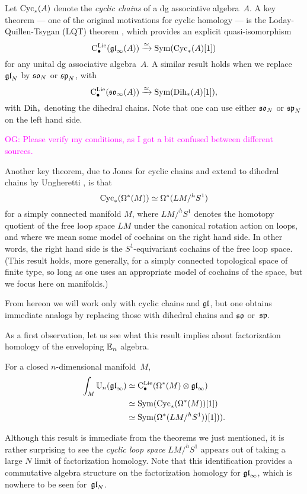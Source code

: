 \documentclass[11pt]{amsart}
\numberwithin{equation}{section}
\def\owen{\textcolor{magenta}{OG: }\textcolor{magenta}}
\begin{document}
Let ${\rm Cyc}_*(A)$ denote the {\em cyclic chains} of a dg associative algebra~$A$.
A key theorem --- one of the original motivations for cyclic homology --- is the Loday-Quillen-Tsygan (LQT) theorem \cite{},
which provides an explicit quasi-isomorphism
\begin{equation}
\label{eqn: LQT}
{\rm C}^{\rm Lie}_\bullet({\mathfrak{gl}}_\infty(A)) \xrightarrow{\simeq} {\rm Sym}({\rm Cyc}_*(A)[1])
\end{equation}
for any unital dg associative algebra~$A$.
A similar result \cite{} holds when we replace ${\mathfrak{gl}}_N$ by $\frak{so}_N$ or $\frak{sp}_N$, with
\[
\label{eqn: LQT}
{\rm C}^{\rm Lie}_\bullet({\frak{so}}_\infty(A)) \xrightarrow{\simeq} {\rm Sym}({\rm Dih}_*(A)[1]),
\]
with ${\rm Dih}_*$ denoting the dihedral chains.
Note that one can use either $\frak{so}_N$ or $\frak{sp}_N$ on the left hand side.

\owen{Please verify my conditions, as I got a bit confused between different sources.}

Another key theorem, due to Jones \cite{} for cyclic chains and extend to dihedral chains by Ungheretti \cite{},
is that
\[
{\rm Cyc}_*(\Omega^*(M)) \simeq \Omega^*(LM/^h S^1)
\]
for a simply connected manifold $M$, 
where $LM/^h S^1$ denotes the homotopy quotient of the free loop space $LM$ under the canonical rotation action on loops,
and where we mean some model of cochains on the right hand side.
In other words, the right hand side is the $S^1$-equivariant cochains of the free loop space.
(This result holds, more generally, for a simply connected topological space of finite type, so long as one uses an appropriate model of cochains of the space, 
but we focus here on manifolds.)

From hereon we will work only with cyclic chains and ${\mathfrak{gl}}$,
but one obtains immediate analogs by replacing those with dihedral chains and $\frak{so}$ or~$\frak{sp}$.

As a first observation, let us see what this result implies about factorization homology of the enveloping $\mathbb E_n$ algebra.

\begin{lmm}
For a closed $n$-dimensional manifold~$M$, 
\begin{align*}
\int_M \mathbb U_n(\frak{gl}_\infty)
&\simeq {\rm C}^{\rm Lie}_\bullet(\Omega^*(M) \otimes {\mathfrak{gl}}_\infty) \\
&\simeq {\rm Sym}({\rm Cyc}_*(\Omega^*(M))[1]) \\
&\simeq {\rm Sym}(\Omega^*(LM/^h S^1))[1])).
\end{align*}
\end{lmm}

Although this result is immediate from the theorems we just mentioned,
it is rather surprising to see the {\em cyclic loop space} $LM/^h S^1$ appears out of taking a large $N$ limit of factorization homology.
Note that this identification provides a commutative algebra structure on the factorization homology for ${\mathfrak{gl}}_\infty$, 
which is nowhere to be seen for~${\mathfrak{gl}}_N$.
\end{document}
